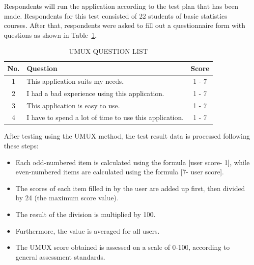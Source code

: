 \documentclass[conference,a4paper]{IEEEtran}
\begin{document}
\begin{enumerate}[label=\alph*.]
        Respondents will run the application according to the test plan that has been made. Respondents for this test consisted of 22 students of basic statistics courses. After that, respondents were asked to fill out a questionnaire form with questions as shown in Table~\ref{tab:umux_question_list}.

        \begin{table}[H]
          \caption{UMUX QUESTION LIST \cite{b27}}
          \label{tab:umux_question_list}
          \centering
          \renewcommand{\arraystretch}{2.2} %
          \begin{tabular}{|c|p{6cm}|c|} %
            \hline
            \textbf{No.} & \textbf{Question}                                      & \textbf{Score} \\ \hline
            1            & This application suits my needs.                       & 1 - 7          \\ \hline
            2            & I had a bad experience using this application.         & 1 - 7          \\ \hline
            3            & This application is easy to use.                       & 1 - 7          \\ \hline
            4            & I have to spend a lot of time to use this application. & 1 - 7          \\ \hline
          \end{tabular}
        \end{table}

\end{enumerate}



After testing using the UMUX method, the test result data is processed following these steps:
\begin{itemize}
  \item Each odd-numbered item is calculated using the formula [user score- 1], while even-numbered items are calculated using the formula [7- user score].
  \item The scores of each item filled in by the user are added up first, then divided by 24 (the maximum score value).
  \item The result of the division is multiplied by 100.
  \item Furthermore, the value is averaged for all users.
  \item The UMUX score obtained is assessed on a scale of 0-100, according to general assessment standards\cite{b28}.
\end{itemize}
\end{document}
